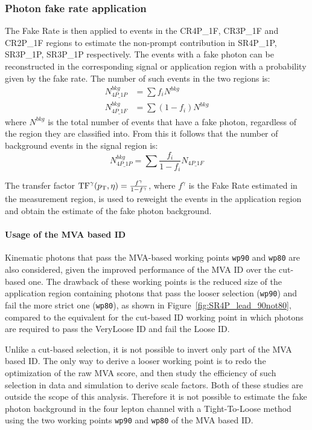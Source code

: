 \subsubsection{Photon fake rate application}
The Fake Rate is then applied to events in the CR4P\_1F, CR3P\_1F and CR2P\_1F regions to estimate the non-prompt contribution in SR4P\_1P, SR3P\_1P, SR3P\_1P respectively.
The events with a fake photon can be reconstructed in the corresponding signal or application region
with a probability given by the fake rate.
The number of such events in the two regions is:
\begin{equation}
  \begin{split}
    \label{eq:fakeRate_explanation_part1}
    N^{bkg}_{4P\_1P} &= \sum f_i N^{bkg}
    \\
    N^{bkg}_{4P\_1F} &= \sum ( 1-f_i ) N^{bkg}
  \end{split}
\end{equation}
where $N^{bkg}$ is the total number of events that have a fake photon, regardless of the region they are classified into.
From this it follows that the number of background events in the signal region is:
\begin{equation}
  \label{eq:fakeRate_explanation_part2}
  N^{bkg}_{4P\_1P} = \sum \frac{f_i}{1-f_i} N_{4P\_1F}
\end{equation}

The transfer factor
$\text{TF}^\gamma(p_{\mathrm{T}}, \eta) = \frac{f^\gamma}{1-f^\gamma}$,
where $f^\gamma$ is the Fake Rate estimated in the measurement region,
is used to reweight the events in the application region and obtain
the estimate of the fake photon background.

\paragraph{Usage of the MVA based ID\\}
Kinematic photons that pass the MVA-based working points \texttt{wp90} and \texttt{wp80} are also considered,
given the improved performance of the MVA ID over the cut-based one.
The drawback of these working points is the reduced size of the application region containing
photons that pass the looser selection (\texttt{wp90}) and fail the more strict one (\texttt{wp80}),
as shown in Figure~\ref{fig:SR4P_lead_90not80},
compared to the equivalent for the cut-based ID working point
in which photons are required to pass the VeryLoose ID and fail the Loose ID.

Unlike a cut-based selection, it is not possible to invert only part of the MVA based ID.
The only way to derive a looser working point is to redo the optimization of the raw MVA score,
and then study the efficiency of such selection in data and simulation to derive scale factors.
Both of these studies are outside the scope of this analysis.
Therefore it is not possible to estimate the fake photon background in the four lepton channel
with a Tight-To-Loose method using the two working points \texttt{wp90} and \texttt{wp80} of the MVA based ID.

